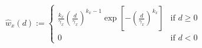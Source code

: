 \begin{equation}
\hat{w}_x(d) :=
	\begin{cases}
		\frac{k_x}{\gamma_x}\left(\frac{d}{\gamma_x}\right)^{k_x-1}\exp\left[-\left(\frac{d}{\gamma_x}\right)^{k_x}\right] &\text{if } d \geq 0 \\
		0 &\text{if } d < 0
	\end{cases}
	\label{ch4:equ:weibull-distribution}
\end{equation}
